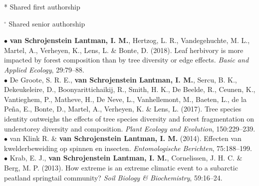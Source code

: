\documentclass[b5paper,10pt]{book} %
\newlength{\thumbheight}
\newlength{\thumbwidth}
\begin{document}
	\begin{footnotesize}* Shared first authorship

	$^\circ$ Shared senior authorship \end{footnotesize}

	\newpage

	$\bullet$ \textbf{van Schrojenstein Lantman, I. M.}, Hertzog, L. R., Vandegehuchte, M. L., Martel, A., Verheyen, K., Lens, L. \& Bonte, D. (2018). Leaf herbivory is more impacted by forest composition than by tree diversity or edge effects. \textit{Basic and Applied Ecology}, 29:79--88.\\

	$\bullet$ De Groote, S. R. E., \textbf{van Schrojenstein Lantman, I. M.}, Sercu, B. K., Dekeukeleire, D., Boonyarittichaikij, R., Smith, H. K., De Beelde, R., Ceunen, K., Vantieghem, P., Matheve, H., De Neve, L., Vanhellemont, M., Baeten, L., de la Peña, E., Bonte, D., Martel, A., Verheyen, K. \& Lens, L. (2017). Tree species identity outweighs the effects of tree species diversity and forest fragmentation on understorey diversity and composition. \textit{Plant Ecology and Evolution}, 150:229--239.\\

	$\bullet$ van Klink R. \& \textbf{van Schrojenstein Lantman, I. M.} (2014). Effecten van kwelderbeweiding op spinnen en insecten. \textit{Entomologische Berichten}, 75:188--199.\\

	$\bullet$ Krab, E. J., \textbf{van Schrojenstein Lantman, I. M.}, Cornelissen, J. H. C. \& Berg, M. P. (2013). How extreme is an extreme climatic event to a subarctic peatland springtail community? \textit{Soil Biology \& Biochemistry}, 59:16--24.\\ 


	

	\begingroup 
	\small
	\singlespace

		\newpage
	\thispagestyle{empty}
\setlength{\thumbwidth}{0cm}
\setlength{\thumbheight}{0cm}
	\begin{footnotesize}
	
	\end{footnotesize} 
	\endgroup
	\onehalfspace
	


\setlength{\thumbwidth}{0cm}
\setlength{\thumbheight}{0cm}
	\newpage
\end{document}
